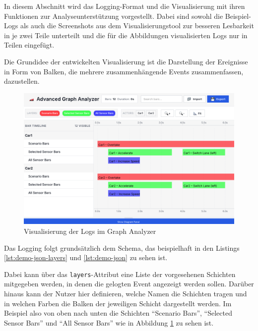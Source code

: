 In diesem Abschnitt wird das Logging-Format und die Visualisierung mit ihren Funktionen zur Analyseunterstützung vorgestellt. Dabei sind sowohl die Beispiel-Logs als auch die Screenshots aus dem Visualisierungstool zur besseren Lesbarkeit in je zwei Teile unterteilt und die für die Abbildungen visualisierten Logs nur in Teilen eingefügt.

Die Grundidee der entwickelten Visualisierung ist die Darstellung der Ereignisse in Form von Balken, die mehrere zusammenhängende Events zusammenfassen, dazustellen.

\begin{figure}[htb]
    \centering
    \includegraphics[width=\textwidth]{contents/figures/graph_analyzer.png}
    \caption{Visualisierung der Logs im Graph Analyzer}
    \label{fig:analyzer_graph}
\end{figure}

Das Logging folgt grundsätzlich dem Schema, das beispielhaft in den Listings \ref{lst:demo-json-layers} und \ref{lst:demo-json} zu sehen ist.



Dabei kann über das \texttt{layers}-Attribut eine Liste der vorgesehenen Schichten mitgegeben werden, in denen die gelogten Event angezeigt werden sollen. Darüber hinaus kann der Nutzer hier definieren, welche Namen die Schichten tragen und in welchen Farben die Balken der jeweiligen Schicht dargestellt werden. Im Beispiel also von oben nach unten die Schichten \enquote{Scenario Bars}, \enquote{Selected Sensor Bars} und \enquote{All Sensor Bars} wie in Abbildung \ref{fig:analyzer_graph} zu sehen ist.

